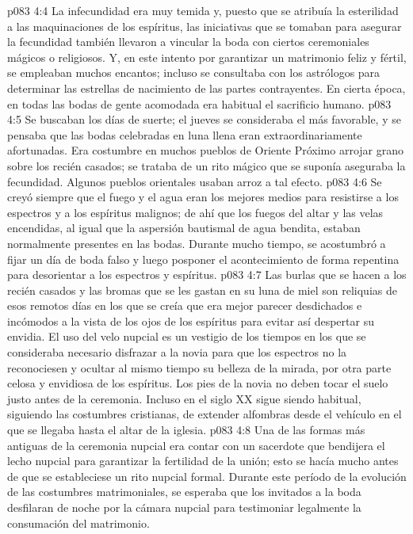 \vs p083 4:4 \pc La infecundidad era muy temida y, puesto que se atribuía la esterilidad a las maquinaciones de los espíritus, las iniciativas que se tomaban para asegurar la fecundidad también llevaron a vincular la boda con ciertos ceremoniales mágicos o religiosos. Y, en este intento por garantizar un matrimonio feliz y fértil, se empleaban muchos encantos; incluso se consultaba con los astrólogos para determinar las estrellas de nacimiento de las partes contrayentes. En cierta época, en todas las bodas de gente acomodada era habitual el sacrificio humano.
\vs p083 4:5 Se buscaban los días de suerte; el jueves se consideraba el más favorable, y se pensaba que las bodas celebradas en luna llena eran extraordinariamente afortunadas. Era costumbre en muchos pueblos de Oriente Próximo arrojar grano sobre los recién casados; se trataba de un rito mágico que se suponía aseguraba la fecundidad. Algunos pueblos orientales usaban arroz a tal efecto.
\vs p083 4:6 Se creyó siempre que el fuego y el agua eran los mejores medios para resistirse a los espectros y a los espíritus malignos; de ahí que los fuegos del altar y las velas encendidas, al igual que la aspersión bautismal de agua bendita, estaban normalmente presentes en las bodas. Durante mucho tiempo, se acostumbró a fijar un día de boda falso y luego posponer el acontecimiento de forma repentina para desorientar a los espectros y espíritus.
\vs p083 4:7 Las burlas que se hacen a los recién casados y las bromas que se les gastan en su luna de miel son reliquias de esos remotos días en los que se creía que era mejor parecer desdichados e incómodos a la vista de los ojos de los espíritus para evitar así despertar su envidia. El uso del velo nupcial es un vestigio de los tiempos en los que se consideraba necesario disfrazar a la novia para que los espectros no la reconociesen y ocultar al mismo tiempo su belleza de la mirada, por otra parte celosa y envidiosa de los espíritus. Los pies de la novia no deben tocar el suelo justo antes de la ceremonia. Incluso en el siglo XX sigue siendo habitual, siguiendo las costumbres cristianas, de extender alfombras desde el vehículo en el que se llegaba hasta el altar de la iglesia.
\vs p083 4:8 Una de las formas más antiguas de la ceremonia nupcial era contar con un sacerdote que bendijera el lecho nupcial para garantizar la fertilidad de la unión; esto se hacía mucho antes de que se estableciese un rito nupcial formal. Durante este período de la evolución de las costumbres matrimoniales, se esperaba que los invitados a la boda desfilaran de noche por la cámara nupcial para testimoniar legalmente la consumación del matrimonio.
